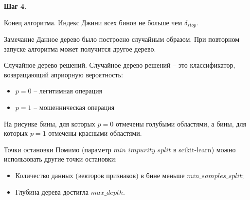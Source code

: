 \begin{frame}
	\small
	\textbf{Шаг 4}.
	\begin{center}
	\begin{tikzpicture}[scale=1.5]
	
	\end{tikzpicture}
	\end{center}
	Конец алгоритма. Индекс Джини всех бинов не больше чем $\delta_{stop}$.
	\begin{block}{Замечание}
	Данное дерево было построено случайным образом. 
	При повторном запуске алгоритма может получится другое дерево.
	\end{block}
\end{frame}

\begin{frame}{Случайное дерево решений.}
	\small
	Случайное дерево решений -- это 
	 классификатор,
	возвращающий априорную вероятность:
	\begin{itemize}
	\item $p=0$ -- легитимная операция
	\item $p=1$ -- мошенническая операция
	\end{itemize}

	\begin{figure}
	\vspace{-25pt}
	\begin{tikzpicture}[scale=1.5]
	
	\end{tikzpicture}
	\end{figure}
	
	На рисунке бины, для которых $p=0$ отмечены голубыми областями,
	а бины, для которых $p=1$ отмечены красными областями.
\end{frame}

\begin{frame}{Точки остановки}
	Помимо  (параметр $min\_impurity\_split$ в scikit-learn)
	можно использовать другие точки остановки:
	\begin{itemize}
	\item Количество данных (векторов признаков)
	в бине меньше $min\_samples\_split$;
	\item Глубина дерева достигла $max\_depth$.
	\end{itemize}
	
\end{frame}

